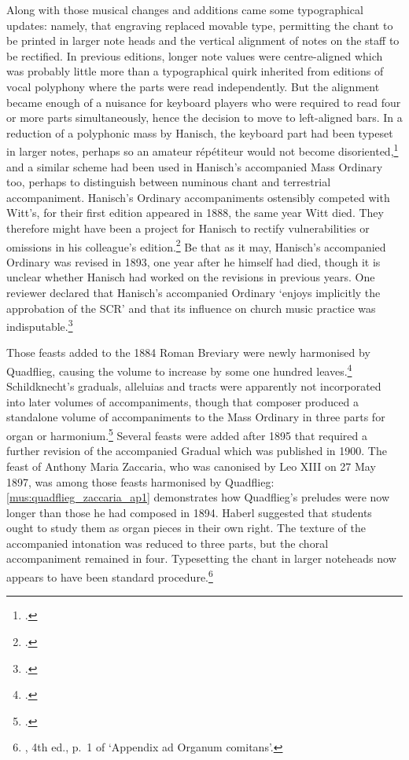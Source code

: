 %
Along with those musical changes and additions came some typographical updates: namely, that engraving replaced movable type, permitting the chant to be printed in larger note heads and the vertical alignment of notes on the staff to be rectified.
In previous editions, longer note values were centre-aligned which was probably little more than a typographical quirk inherited from editions of vocal polyphony where the parts were read independently.
But the alignment became enough of a nuisance for keyboard players who were required to read four or more parts simultaneously, hence the decision to move to left-aligned bars.
In a reduction of a polyphonic mass by Hanisch, the keyboard part had been typeset in larger notes, perhaps so an amateur répétiteur would not become disoriented,\footcite[1 and \emph{passim}]{HanischZweiLateinischeMessen1870} and a similar scheme had been used in Hanisch's accompanied Mass Ordinary too, perhaps to distinguish between numinous chant and terrestrial accompaniment.
%
Hanisch's Ordinary accompaniments ostensibly competed with Witt's, for their first edition appeared in 1888, the same year Witt died.
They therefore might have been a project for Hanisch to rectify vulnerabilities or omissions in his colleague's edition.\footnote{\covid{}\cite{HanischOrganumcomitansad1888}.}
Be that as it may, Hanisch's accompanied Ordinary was revised in 1893, one year after he himself had died, though it is unclear whether Hanisch had worked on the revisions in previous years.
One reviewer declared that Hanisch's accompanied Ordinary `enjoys implicitly the approbation of the SCR' and that its influence on church music practice was indisputable.\footcite[78]{ReviewOrganumcomitans1893}

Those feasts added to the 1884 Roman Breviary were newly harmonised by Quadflieg, causing the volume to increase by some one hundred leaves.\footcite[82--4]{HaberlvollstaendigeOrgelbegleitungGraduale1895}
Schildknecht's graduals, alleluias and tracts were apparently not incorporated into later volumes of accompaniments, though that composer produced a standalone volume of accompaniments to the Mass Ordinary in three parts for organ or harmonium.\footnote{\covid{}\cite{SchildknechtAllerleichtesteBegleitungOrdinarium1897}.}
Several feasts were added after 1895 that required a further revision of the accompanied Gradual which was published in 1900.
The feast of Anthony Maria Zaccaria, who was canonised by Leo XIII on 27 May 1897, was among those feasts harmonised by Quadflieg: \cref{mus:quadflieg_zaccaria_ap1} demonstrates how Quadflieg's preludes were now longer than those he had composed in 1894.
Haberl suggested that students ought to study them as organ pieces in their own right.
The texture of the accompanied intonation was reduced to three parts, but the choral accompaniment remained in four.
Typesetting the chant in larger noteheads now appears to have been standard procedure.\footnote{\cite{HaberlOrganumcomitansquod1900}, 4th ed., p.~1 of `Appendix ad Organum comitans'.}


